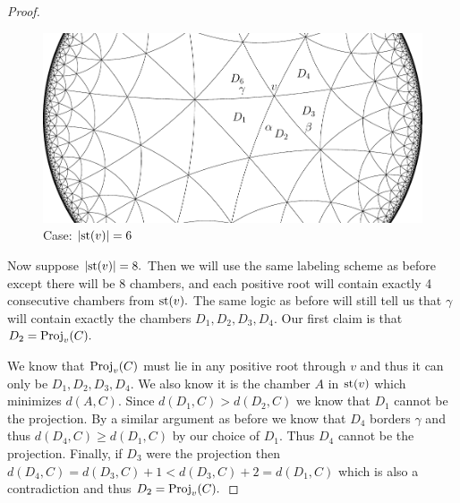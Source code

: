 \documentclass[class=book, crop=false]{standalone}
\begin{document}
\begin{proof}
	\begin{figure}
		\label{fig:334deg6}
		\includegraphics{diagrams/deg6433f2.pdf}
		\caption{Case: $|\mathrm{st}(v)|=6$}
	\end{figure}

	
	Now suppose $|\mathrm{st}(v)|=8.$ Then we will use the same labeling scheme as before except there will be $8$ chambers, and each positive root will contain exactly 4 consecutive chambers from $\mathrm{st}(v).$ The same logic as before will still tell us that $\gamma$ will contain exactly the chambers $D_1,D_2,D_3,D_4.$ Our first claim is that $D_2=\mathrm{Proj}_v(C).$

	We know that $\mathrm{Proj}_v(C)$ must lie in any positive root through $v$ and thus it can only be $D_1,D_2,D_3,D_4.$ We also know it is the chamber $A$ in $\mathrm{st}(v)$ which minimizes $d(A,C).$ Since $d(D_1,C)>d(D_2,C)$ we know that $D_1$ cannot be the projection. By a similar argument as before we know that $D_4$ borders $\gamma$ and thus $d(D_4,C)\ge d(D_1,C)$ by our choice of $D_1.$ Thus $D_4$ cannot be the projection. Finally, if $D_3$ were the projection then $d(D_4,C)=d(D_3,C)+1<d(D_3,C)+2=d(D_1,C)$ which is also a contradiction and thus $D_2=\mathrm{Proj}_v(C).$


\end{proof}
\end{document}
